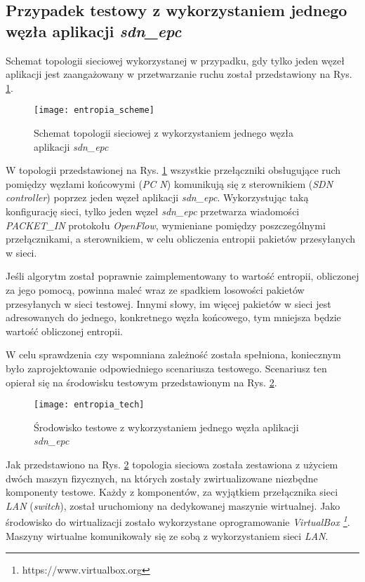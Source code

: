 \subsection{Przypadek testowy z wykorzystaniem jednego węzła aplikacji
  \textit{sdn\_epc}} \label{entropy_one_node}

Schemat topologii sieciowej wykorzystanej w przypadku, gdy tylko jeden węzeł
aplikacji jest zaangażowany w przetwarzanie ruchu został przedstawiony na
Rys. \ref{fig:entropia_scheme}.

\begin{figure}[h]
\centering
\texttt{[image: entropia\_scheme]}
\caption{Schemat topologii sieciowej z wykorzystaniem jednego węzła aplikacji
  \textit{sdn\_epc}}
\label{fig:entropia_scheme}
\end{figure}

W topologii przedstawionej na Rys. \ref{fig:entropia_scheme} wszystkie
przełączniki obsługujące ruch pomiędzy węzłami końcowymi (\textit{PC N})
komunikują się z sterownikiem (\textit{SDN controller}) poprzez jeden węzeł
aplikacji \textit{sdn\_epc}. Wykorzystując taką konfigurację sieci, tylko jeden
węzeł \textit{sdn\_epc} przetwarza wiadomości \mbox{\textit{PACKET\_IN}}
protokołu \textit{OpenFlow}, wymieniane pomiędzy poszczególnymi przełącznikami,
a sterownikiem, w celu obliczenia entropii pakietów przesyłanych w sieci.

Jeśli algorytm został poprawnie zaimplementowany to wartość entropii,
obliczonej za jego pomocą, powinna maleć wraz ze spadkiem losowości pakietów
przesyłanych w sieci testowej. Innymi słowy, im więcej pakietów w sieci jest
adresowanych do jednego, konkretnego węzła końcowego, tym mniejsza będzie wartość
obliczonej entropii.

W celu sprawdzenia czy wspomniana zależność została spełniona, koniecznym było
zaprojektowanie odpowiedniego scenariusza testowego. Scenariusz ten opierał się
na środowisku testowym przedstawionym na Rys. \ref{fig:entropia_tech}.

\begin{figure}[h]
\centering
\texttt{[image: entropia\_tech]}
\caption{Środowisko testowe z wykorzystaniem jednego węzła aplikacji
  \textit{sdn\_epc}}
\label{fig:entropia_tech}
\end{figure}

Jak przedstawiono na Rys. \ref{fig:entropia_tech} topologia sieciowa została
zestawiona z użyciem dwóch maszyn fizycznych, na których zostały zwirtualizowane
niezbędne komponenty testowe. Każdy z komponentów, za wyjątkiem przełącznika
sieci \textit{LAN} (\textit{switch}), został uruchomiony na dedykowanej maszynie
wirtualnej. Jako środowisko do wirtualizacji zostało wykorzystane oprogramowanie
\textit{VirtualBox \footnote{https://www.virtualbox.org}}. Maszyny wirtualne
komunikowały się ze sobą z wykorzystaniem sieci \textit{LAN}.

